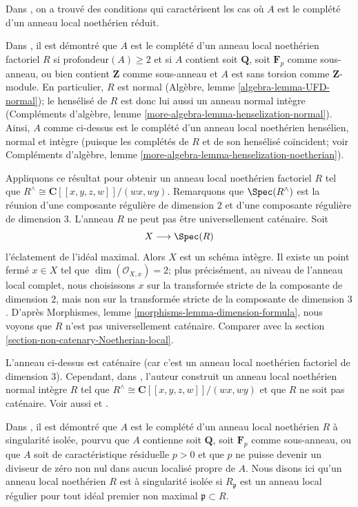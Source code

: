 \medskip\noindent
Dans \cite{LLPY}, on a trouvé des conditions qui caractérisent les cas où $A$ est
le complété d'un anneau local noethérien réduit.

\medskip\noindent
Dans \cite{Heitmann-completion-UFD}, il est démontré que $A$ est le complété
d'un anneau local noethérien factoriel $R$ si $\text{profondeur}(A) \geq 2$ et si $A$ contient
soit $\mathbf{Q}$, soit $\mathbf{F}_p$ comme sous-anneau, ou bien contient $\mathbf{Z}$
comme sous-anneau et $A$ est sans torsion comme $\mathbf{Z}$-module.
En particulier, $R$ est normal (Algèbre, lemme \ref{algebra-lemma-UFD-normal});
le hensélisé de $R$ est donc lui aussi un anneau normal intègre
(Compléments d'algèbre, lemme \ref{more-algebra-lemma-henselization-normal}).
Ainsi, $A$ comme ci-dessus est le complété d'un anneau local noethérien
hensélien, normal et intègre (puisque les complétés de $R$ et de son hensélisé coïncident;
voir Compléments d'algèbre, lemme \ref{more-algebra-lemma-henselization-noetherian}).

\medskip\noindent
Appliquons ce résultat pour obtenir un anneau local noethérien factoriel $R$ tel que
$R^\wedge \cong \mathbf{C}[[x, y, z, w]]/(wx, wy)$.
Remarquons que $\Spec(R^\wedge)$ est la
réunion d'une composante régulière de dimension $2$ et d'une composante régulière de dimension $3$.
L'anneau $R$ ne peut pas être universellement caténaire. Soit
$$
X \longrightarrow \Spec(R)
$$
l'éclatement de l'idéal maximal. Alors $X$ est un schéma intègre.
Il existe un point fermé $x \in X$ tel que $\dim(\mathcal{O}_{X, x}) = 2$;
plus précisément, au niveau de l'anneau local complet, nous choisissons $x$ sur la
transformée stricte de la composante de dimension $2$, mais non sur la transformée stricte
de la composante de dimension $3$. D'après
Morphismes, lemme \ref{morphisms-lemma-dimension-formula},
nous voyons que $R$ n'est pas universellement caténaire. Comparer avec la
section \ref{section-non-catenary-Noetherian-local}.

\medskip\noindent
L'anneau ci-dessus est caténaire (car c'est un anneau local noethérien factoriel de dimension $3$).
Cependant, dans \cite{Ogoma-example}, l'auteur construit un anneau local
noethérien normal intègre $R$ tel que $R^\wedge \cong \mathbf{C}[[x, y, z, w]]/(wx, wy)$
et que $R$ ne soit pas caténaire. Voir aussi \cite{Heitmann-Ogoma} et
\cite{Lech-YAPO}.

\medskip\noindent
Dans \cite{Heitmann-isolated}, il est démontré que $A$ est le complété
d'un anneau local noethérien $R$ à singularité isolée,
pourvu que $A$ contienne soit $\mathbf{Q}$, soit $\mathbf{F}_p$ comme sous-anneau,
ou que $A$ soit de caractéristique résiduelle $p > 0$ et que $p$ ne puisse devenir un
diviseur de zéro non nul dans aucun localisé propre de $A$.
Nous disons ici qu'un anneau local noethérien $R$
est à singularité isolée si $R_\mathfrak p$ est
un anneau local régulier pour tout idéal premier non maximal $\mathfrak p \subset R$.


